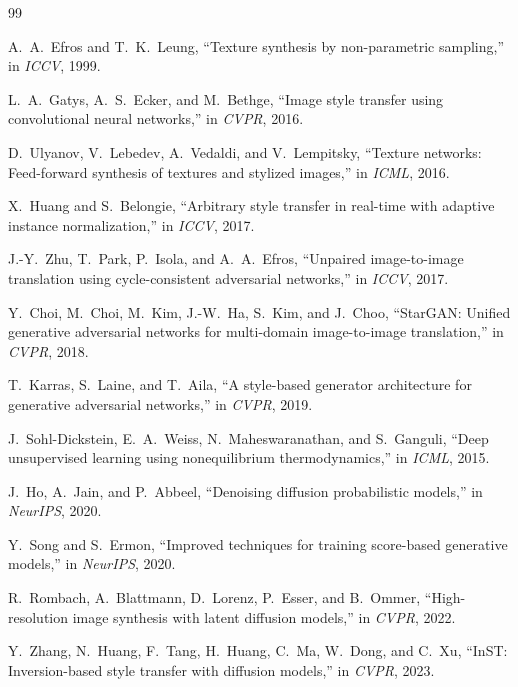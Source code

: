 \documentclass[twocolumn,a4paper,11pt]{ctexart}
\begin{document}
\begin{thebibliography}{99}

 A.~A.~Efros and T.~K.~Leung, ``Texture synthesis by non-parametric sampling,'' in \emph{ICCV}, 1999.

 L.~A.~Gatys, A.~S.~Ecker, and M.~Bethge, ``Image style transfer using convolutional neural networks,'' in \emph{CVPR}, 2016.

 D.~Ulyanov, V.~Lebedev, A.~Vedaldi, and V.~Lempitsky, ``Texture networks: Feed-forward synthesis of textures and stylized images,'' in \emph{ICML}, 2016.

 X.~Huang and S.~Belongie, ``Arbitrary style transfer in real-time with adaptive instance normalization,'' in \emph{ICCV}, 2017.

 J.-Y.~Zhu, T.~Park, P.~Isola, and A.~A.~Efros, ``Unpaired image-to-image translation using cycle-consistent adversarial networks,'' in \emph{ICCV}, 2017.

 Y.~Choi, M.~Choi, M.~Kim, J.-W.~Ha, S.~Kim, and J.~Choo, ``StarGAN: Unified generative adversarial networks for multi-domain image-to-image translation,'' in \emph{CVPR}, 2018.

 T.~Karras, S.~Laine, and T.~Aila, ``A style-based generator architecture for generative adversarial networks,'' in \emph{CVPR}, 2019.

 J.~Sohl-Dickstein, E.~A.~Weiss, N.~Maheswaranathan, and S.~Ganguli, ``Deep unsupervised learning using nonequilibrium thermodynamics,'' in \emph{ICML}, 2015.

 J.~Ho, A.~Jain, and P.~Abbeel, ``Denoising diffusion probabilistic models,'' in \emph{NeurIPS}, 2020.

 Y.~Song and S.~Ermon, ``Improved techniques for training score-based generative models,'' in \emph{NeurIPS}, 2020.

 R.~Rombach, A.~Blattmann, D.~Lorenz, P.~Esser, and B.~Ommer, ``High-resolution image synthesis with latent diffusion models,'' in \emph{CVPR}, 2022.

 Y.~Zhang, N.~Huang, F.~Tang, H.~Huang, C.~Ma, W.~Dong, and C.~Xu, ``InST: Inversion-based style transfer with diffusion models,'' in \emph{CVPR}, 2023.


\end{thebibliography}
\end{document}
